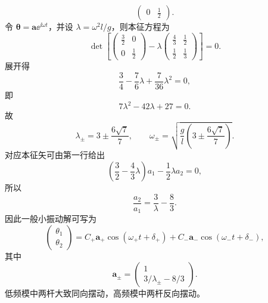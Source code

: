 \begin{question}[双匀质杆小振动]
\begin{solution}
\[\begin{pmatrix}
    0&\frac12
  \end{pmatrix}.
\]
令 $\bm\theta=\bm a\ee^{\ii\omega t}$，并设 $\lambda=\omega^2l/g$，则本征方程为
\[
  \det\left[
  \begin{pmatrix}\frac32&0\\0&\frac12\end{pmatrix}
  -\lambda
  \begin{pmatrix}\frac43&\frac12\\\frac12&\frac13\end{pmatrix}
  \right]=0.
\]
展开得
\[
  \frac34-\frac76\lambda+\frac7{36}\lambda^2=0,
\]
即
\[
  7\lambda^2-42\lambda+27=0.
\]
故
\[
  \lambda_{\pm}=3\pm\frac{6\sqrt7}{7},
  \qquad
  \boxed{\omega_{\pm}=\sqrt{\frac gl\left(3\pm\frac{6\sqrt7}{7}\right)}}.
\]
对应本征矢可由第一行给出
\[
  \left(\frac32-\frac43\lambda\right)a_1-\frac12\lambda a_2=0,
\]
所以
\[
  \frac{a_2}{a_1}=\frac{3}{\lambda}-\frac83.
\]
因此一般小振动解可写为
\[
  \begin{pmatrix}\theta_1\\\theta_2\end{pmatrix}
  =C_+\bm a_+\cos(\omega_+t+\delta_+)
   +C_-\bm a_-\cos(\omega_-t+\delta_-),
\]
其中
\[
  \bm a_\pm=\begin{pmatrix}1\\[2pt]3/\lambda_\pm-8/3\end{pmatrix}.
\]
低频模中两杆大致同向摆动，高频模中两杆反向摆动。
\end{solution}
\end{question}

